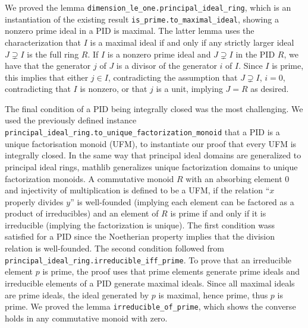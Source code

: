 \documentclass[a4paper,USenglish,cleveref, autoref, thm-restate]{lipics-v2021}
\newcommand{\lean}[1]{\texttt{#1}\xspace} %
\newcommand{\mathlib}{\textsf{mathlib}\xspace}
\begin{document}
We proved the lemma \lean{dimension\_le\_one.principal\_ideal\_ring}, which is an instantiation of the existing result \lean{is\_prime.to\_maximal\_ideal}, showing a nonzero prime ideal in a PID is maximal.
The latter lemma uses the characterization that $I$ is a maximal ideal if and only if any strictly larger ideal $J\supsetneq I$ is the full ring $R$.
If $I$ is a nonzero prime ideal and $J \supsetneq I$ in the PID $R$, we have that the generator $j$ of $J$ is a divisor of the generator $i$ of $I$. Since $I$ is prime, this implies that either $j \in I$, contradicting the assumption that $J \supsetneq I$, $i = 0$, contradicting that $I$ is nonzero, or that $j$ is a unit, implying $J = R$ as desired.

The final condition of a PID being integrally closed was the most challenging.
We used the previously defined instance \lean{principal\_ideal\_ring.to\_unique\_factorization\_monoid} that a PID is a unique factorisation monoid (UFM),
to instantiate our proof that every UFM is integrally closed.
In the same way that principal ideal domains are generalized to principal ideal rings, \mathlib generalizes unique factorization domains to unique factorization monoids.
A commutative monoid $R$ with an absorbing element $0$ and injectivity of multiplication is defined to be a UFM,
if the relation ``$x$ properly divides $y$'' is well-founded (implying each element can be factored as a product of irreducibles) and
an element of $R$ is prime if and only if it is irreducible (implying the factorization is unique).
The first condition wass satisfied for a PID since the Noetherian property implies that the division relation is well-founded.
The second condition followed from \lean{principal\_ideal\_ring.irreducible\_iff\_prime}.
To prove that an irreducible element $p$ is prime, the proof uses that prime elements generate prime ideals and irreducible elements of a PID generate maximal ideals. Since all maximal ideals are prime ideals, the ideal generated by $p$ is maximal, hence prime, thus $p$ is prime.
We proved the lemma \lean{irreducible\_of\_prime}, which shows the converse holds in any commutative monoid with zero.
\end{document}
